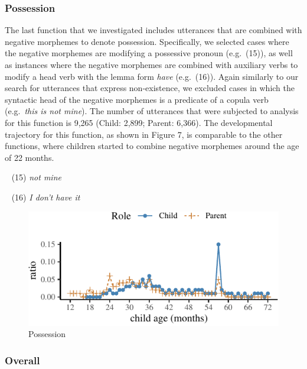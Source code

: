 \documentclass[10pt, letterpaper]{article}
\newenvironment{CodeChunk}{}{}
\begin{document}
\hypertarget{possession}{%
\subsubsection{Possession}\label{possession}}

The last function that we investigated includes utterances that are
combined with negative morphemes to denote possession. Specifically, we
selected cases where the negative morphemes are modifying a possessive
pronoun (e.g.~(15)), as well as instances where the negative morphemes
are combined with auxiliary verbs to modify a head verb with the lemma
form \emph{have} (e.g.~(16)). Again similarly to our search for
utterances that express non-existence, we excluded cases in which the
syntactic head of the negative morphemes is a predicate of a copula verb
(e.g.~\emph{this is not mine}). The number of utterances that were
subjected to analysis for this function is 9,265 (Child: 2,899; Parent:
6,366). The developmental trajectory for this function, as shown in
Figure 7, is comparable to the other functions, where children started
to combine negative morphemes around the age of 22 months.

~ (15) \emph{not mine}

~ (16) \emph{I don't have it}

\begin{CodeChunk}
\begin{figure}[H]

{\centering \includegraphics{figs/possession-1} 

}

\caption[Possession]{Possession}\label{fig:possession}
\end{figure}
\end{CodeChunk}

\hypertarget{overall}{%
\subsubsection{Overall}\label{overall}}
\end{document}
